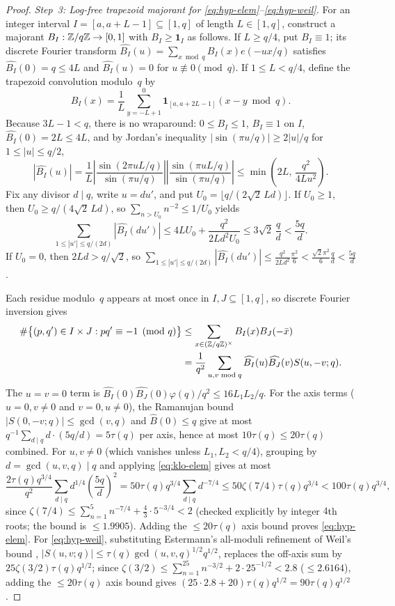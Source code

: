 \documentclass[11pt]{article}
\newcommand{\ind}{\mathbf{1}}
\begin{document}
\begin{proof}
\emph{Step~3: Log-free trapezoid majorant for \eqref{eq:hyp-elem}--\eqref{eq:hyp-weil}.}
For an integer interval $I=[a,a+L-1]\subseteq[1,q]$ of length $L\in[1,q]$, construct a majorant $B_I:\mathbb Z/q\mathbb Z\to[0,1]$ with $B_I\ge\ind_I$ as follows. If $L\ge q/4$, put $B_I\equiv1$; its discrete Fourier transform $\widehat{B_I}(u)=\sum_{x\bmod q}B_I(x)e(-ux/q)$ satisfies $\widehat{B_I}(0)=q\le 4L$ and $\widehat{B_I}(u)=0$ for $u\not\equiv0\pmod q$. If $1\le L<q/4$, define the trapezoid convolution modulo~$q$ by
\[
B_I(x)=\frac1L\sum_{y=-L+1}^0\ind_{[a,a+2L-1]}(x-y\bmod q).
\]
Because $3L-1<q$, there is no wraparound: $0\le B_I\le1$, $B_I\equiv1$ on $I$, $\widehat{B_I}(0)=2L\le 4L$, and by Jordan's inequality $|\sin(\pi u/q)|\ge 2|u|/q$ for $1\le|u|\le q/2$,
\[
|\widehat{B_I}(u)|=\frac1L\left|\frac{\sin(2\pi uL/q)}{\sin(\pi u/q)}\right|\left|\frac{\sin(\pi uL/q)}{\sin(\pi u/q)}\right|\le\min\!\left(2L,\,\frac{q^2}{4Lu^2}\right).
\]
Fix any divisor $d\mid q$, write $u=du'$, and put $U_0=\lfloor q/(2\sqrt2\,Ld)\rfloor$. If $U_0\ge1$, then $U_0\ge q/(4\sqrt2\,Ld)$, so $\sum_{n>U_0}n^{-2}\le 1/U_0$ yields
\[
\sum_{1\le|u'|\le q/(2d)}|\widehat{B_I}(du')|\le 4LU_0+\frac{q^2}{2Ld^2U_0}\le 3\sqrt2\,\frac qd<\frac{5q}{d}.
\]
If $U_0=0$, then $2Ld>q/\sqrt2$, so $\sum_{1\le|u'|\le q/(2d)}|\widehat{B_I}(du')|\le\frac{q^2}{2Ld^2}\frac{\pi^2}{6}<\frac{\sqrt2\pi^2}{6}\frac qd<\frac{5q}{d}$.

Each residue modulo~$q$ appears at most once in $I,J\subseteq[1,q]$, so discrete Fourier inversion gives
\begin{align*}
\#\bigl\{(p,q')\in I\times J:pq'\equiv-1\pmod q\bigr\}
&\le\sum_{x\in(\mathbb Z/q\mathbb Z)^\times}B_I(x)B_J(-\bar x)\\
&=\frac1{q^2}\sum_{u,v\bmod q}\widehat{B_I}(u)\widehat{B_J}(v)S(u,-v;q).
\end{align*}
The $u=v=0$ term is $\widehat{B_I}(0)\widehat{B_J}(0)\varphi(q)/q^2\le 16L_1L_2/q$. For the axis terms ($u=0,v\ne0$ and $v=0,u\ne0$), the Ramanujan bound $|S(0,-v;q)|\le\gcd(v,q)$ and $\widehat{B}(0)\le q$ give at most $q^{-1}\sum_{d\mid q}d\cdot(5q/d)=5\tau(q)$ per axis, hence at most $10\tau(q)\le 20\tau(q)$ combined. For $u,v\ne0$ (which vanishes unless $L_1,L_2<q/4$), grouping by $d=\gcd(u,v,q)\mid q$ and applying \eqref{eq:klo-elem} gives at most
\[
\frac{2\tau(q)q^{3/4}}{q^2}\sum_{d\mid q}d^{1/4}\left(\frac{5q}{d}\right)^2=50\tau(q)q^{3/4}\sum_{d\mid q}d^{-7/4}\le 50\zeta(7/4)\tau(q)q^{3/4}<100\tau(q)q^{3/4},
\]
since $\zeta(7/4)\le\sum_{n=1}^5n^{-7/4}+\frac43\cdot 5^{-3/4}<2$ (checked explicitly by integer $4$th roots; the bound is $\le1.9905$). Adding the $\le 20\tau(q)$ axis bound proves \eqref{eq:hyp-elem}. For \eqref{eq:hyp-weil}, substituting Estermann's all-moduli refinement \cite{Estermann1961} of Weil's bound \cite{Weil1948}, $|S(u,v;q)|\le\tau(q)\gcd(u,v,q)^{1/2}q^{1/2}$, replaces the off-axis sum by $25\zeta(3/2)\tau(q)q^{1/2}$; since $\zeta(3/2)\le\sum_{n=1}^{25}n^{-3/2}+2\cdot 25^{-1/2}<2.8$ ($\le2.6164$), adding the $\le 20\tau(q)$ axis bound gives $(25\cdot 2.8+20)\tau(q)q^{1/2}=90\tau(q)q^{1/2}$.
\end{proof}
\end{document}
